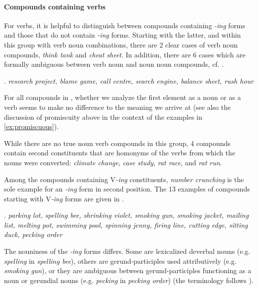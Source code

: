 \paragraph{Compounds containing verbs}

For verbs, it is helpful to distinguish between compounds containing \emph{-ing} forms
and those that do not contain \emph{-ing} forms. Starting with the
latter, and within this group with verb noun combinations, there are 2 clear cases of verb
noun compounds,
\emph{think tank} and \emph{cheat sheet}. In addition, there are 6 cases
which are formally ambiguous between verb noun and noun noun compounds,
cf. \Next.

\ex. \emph{research project, 	blame game, call centre, search engine,
balance sheet, rush hour}

For all compounds in \Last, whether we analyze the first element as a
noun or as a verb seems to make no difference to the meaning we arrive
at (see also the discussion of promiscuity above in the context of the
examples in \ref{ex:promiscuous}).

While there are no true noun verb compounds in this group, 4 compounds
contain second constituents that are homonyms of the verbs from which the
nouns were converted: %
\emph{climate change}, \emph{case study}, \emph{rat race}, and \emph{rat run}.

Among the compounds containing V\emph{-ing} constituents, \emph{number
  crunching} is the sole example for an \emph{-ing} form in second position. The 13
examples of compounds starting with V\emph{-ing} forms are given in \Next.

\ex. \emph{parking lot, spelling bee, shrinking violet, smoking gun, smoking jacket,
mailing list, melting pot, swimming pool, spinning jenny, firing line, cutting edge, sitting
duck, pecking order}

The nouniness of the \emph{-ing} forms differs. Some are lexicalized deverbal nouns (e.g. \emph{spelling} in \emph{spelling bee}),
others are gerund-participles used attributively (e.g. \emph{smoking gun}), or they are ambiguous between gerund-participles functioning as a noun or
gerundial nouns (e.g. \emph{pecking} in \emph{pecking
  order}) (the terminology follows \citealt[Chapter 3, \S 1.4]{HuddlestonandPullum:2002}).

